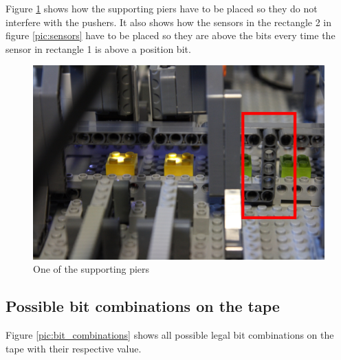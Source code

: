 \documentclass[%
  a4paper,%
  11pt,%
  blue,%
  hyperref	%
  ]{tubsartcl}
\begin{document}
\clearpage

Figure \ref{pic:supporting_pier} shows how the supporting piers have to be placed so they do not interfere with the pushers. It also shows how the sensors in the rectangle 2 in figure \ref{pic:sensors} have to be placed so they are above the bits every time the sensor in rectangle 1 is above a position bit.

\begin{figure}[!htb]
\begin{center}
\includegraphics[scale=0.3]{graphics_lego/supporting_pier.jpg}
\end{center}
\caption{One of the supporting piers}
\label{pic:supporting_pier}
\end{figure}

\subsection{Possible bit combinations on the tape}

Figure \ref{pic:bit_combinations} shows all possible legal bit combinations on the tape with their respective value.
\end{document}
